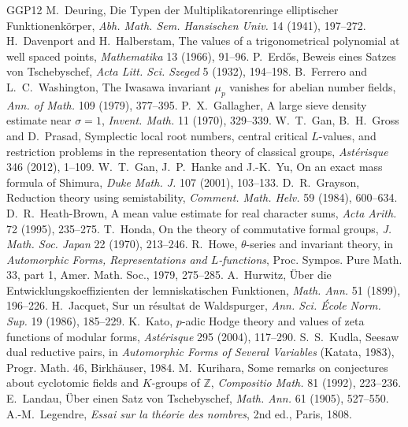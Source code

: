 \documentclass[11pt,letterpaper]{article}
\begin{document}
\begin{thebibliography}{GGP12}
 M.~Deuring, Die Typen der Multiplikatorenringe elliptischer Funktionenk\"orper, \emph{Abh. Math. Sem. Hansischen Univ.} 14 (1941), 197--272.
 H.~Davenport and H.~Halberstam, The values of a trigonometrical polynomial at well spaced points, \emph{Mathematika} 13 (1966), 91--96.
 P.~Erd\H{o}s, Beweis eines Satzes von Tschebyschef, \emph{Acta Litt. Sci. Szeged} 5 (1932), 194--198.
 B.~Ferrero and L.~C.~Washington, The Iwasawa invariant $\mu_p$ vanishes for abelian number fields, \emph{Ann. of Math.} 109 (1979), 377--395.
 P.~X.~Gallagher, A large sieve density estimate near $\sigma=1$, \emph{Invent. Math.} 11 (1970), 329--339.
 W.~T.~Gan, B.~H.~Gross and D.~Prasad, Symplectic local root numbers, central critical $L$-values, and restriction problems in the representation theory of classical groups, \emph{Ast\'erisque} 346 (2012), 1--109.
 W.~T.~Gan, J.~P.~Hanke and J.-K.~Yu, On an exact mass formula of Shimura, \emph{Duke Math. J.} 107 (2001), 103--133.
 D.~R.~Grayson, Reduction theory using semistability, \emph{Comment. Math. Helv.} 59 (1984), 600--634.
 D.~R.~Heath-Brown, A mean value estimate for real character sums, \emph{Acta Arith.} 72 (1995), 235--275.
 T.~Honda, On the theory of commutative formal groups, \emph{J. Math. Soc. Japan} 22 (1970), 213--246.
 R.~Howe, $\theta$-series and invariant theory, in \emph{Automorphic Forms, Representations and $L$-functions}, Proc. Sympos. Pure Math. 33, part 1, Amer. Math. Soc., 1979, 275--285.
 A.~Hurwitz, \"Uber die Entwicklungskoeffizienten der lemniskatischen Funktionen, \emph{Math. Ann.} 51 (1899), 196--226.
 H.~Jacquet, Sur un r\'esultat de Waldspurger, \emph{Ann. Sci. \'Ecole Norm. Sup.} 19 (1986), 185--229.
 K.~Kato, $p$-adic Hodge theory and values of zeta functions of modular forms, \emph{Ast\'erisque} 295 (2004), 117--290.
 S.~S.~Kudla, Seesaw dual reductive pairs, in \emph{Automorphic Forms of Several Variables} (Katata, 1983), Progr. Math. 46, Birkh\"auser, 1984.
 M.~Kurihara, Some remarks on conjectures about cyclotomic fields and $K$-groups of $\mathbb Z$, \emph{Compositio Math.} 81 (1992), 223--236.
 E.~Landau, \"Uber einen Satz von Tschebyschef, \emph{Math. Ann.} 61 (1905), 527--550.
 A.-M.~Legendre, \emph{Essai sur la th\'eorie des nombres}, 2nd ed., Paris, 1808.

\end{thebibliography}
\end{document}
